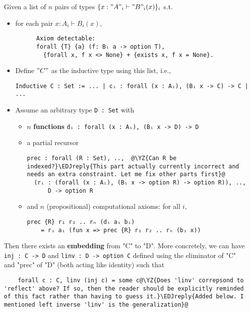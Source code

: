\begin{theorem}\label{thm:prec-complete} Given a list of $n$ pairs of types $\{ x : "A"_i \vdash "B"_i(x) \}_{i}$ s.t.


  \begin{itemize}
    \item {} for each pair $x : A_i \vdash B_i(x)$,
    \begin{verbatim}
      Axiom detectable:
      forall {T} {a} (f: Bᵢ a -> option T),
        {forall x, f x <> None} + {exists x, f x = None}.
    \end{verbatim} 
    \item Define $"C"$ as the inductive type using this list, i.e.,
    \begin{verbatim}
Inductive C : Set := ... | cᵢ : forall (x : Aᵢ), (Bᵢ x -> C) -> C | ...
    \end{verbatim}
    \item Assume an arbitrary type \texttt{D : Set} with
    \begin{itemize}
      \item $n$ \textbf{functions} \texttt{dᵢ : forall (x : Aᵢ), (Bᵢ x -> D) -> D}  
      \item a partial recursor
      \begin{verbatim}
prec : forall (R : Set), ..,  @\YZ{Can R be indexed?}\EDJreply{This part actually currently incorrect and needs an extra constraint. Let me fix other parts first}@
  (rᵢ : (forall (x : Aᵢ), (Bᵢ x -> option R) -> option R)), .., 
      D -> option R
      \end{verbatim}
      \item and $n$ (propositional) computational axioms: for all $i$, 
      \begin{verbatim}
prec {R} r₁ r₂ .. rₙ (dᵢ aᵢ bᵢ) 
    = rᵢ aᵢ (fun x => prec {R} r₁ r₂ .. rₙ (bᵢ x))
      \end{verbatim}
    \end{itemize}
  \end{itemize}
  Then there exists an \textbf{embedding} from "C" to "D".
  More concretely, we can have \texttt{inj : C -> D} and 
  \texttt{linv : D -> option C} defined using the eliminator of
  "C" and "prec" of "D" (both acting like identity) such that
  \begin{verbatim}
    forall c : C, linv (inj c) = some c@\YZ{Does 'linv' correpsond to 'reflect' above? If so, then the reader should be explicitly reminded of this fact rather than having to guess it.}\EDJreply{Added below. I mentioned left inverse 'linv' is the generalization}@
  \end{verbatim}
\end{theorem}
